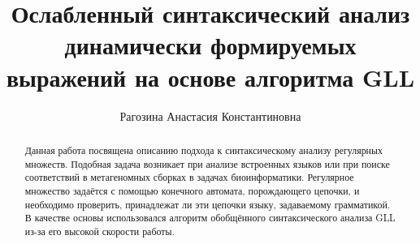 \title{Ослабленный синтаксический анализ динамически формируемых выражений на основе алгоритма GLL}
\author{Рагозина Анастасия Константиновна}
\maketitle

\begin{abstract}
Данная работа посвящена описанию подхода к синтаксическому анализу регулярных множеств. 
Подобная задача возникает при анализе встроенных языков или при поиске соответствий в 
метагеномных сборках в задачах биоинформатики. Регулярное множество задаётся с помощью 
конечного автомата, порождающего цепочки, и необходимо проверить, принадлежат ли эти цепочки
языку, задаваемому грамматикой. В качестве основы использовался алгоритм обобщённого
синтаксического анализа GLL из-за его высокой скорости работы.
\end{abstract}









